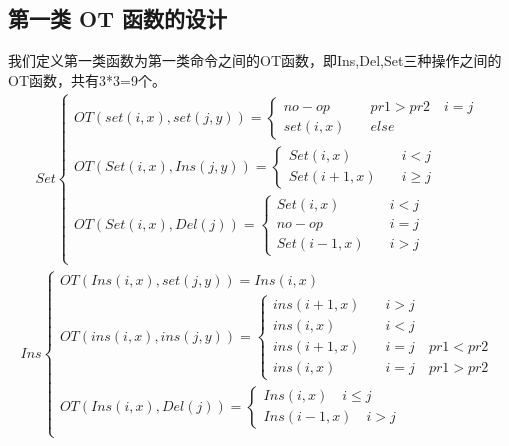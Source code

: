 \subsection{第一类 OT 函数的设计}
我们定义第一类函数为第一类命令之间的OT函数，即Ins,Del,Set三种操作之间的OT函数，共有3*3=9个。
\begin{equation}
\begin{aligned}
Set \begin{cases}
OT(set (i,x), set (j,y)) =\begin{cases}
    no-op \quad &pr1 > pr2 \quad i=j\\
	{set (i,x)} \quad &else \end{cases} \\ 
OT(Set(i,x),Ins(j,y))=\begin{cases}
{Set(i,x)}  \quad &i<j\\
{Set(i+1,x)} \quad  &i\ge j \end{cases} \\
OT(Set(i,x),Del(j))=\begin{cases}
{Set(i,x)} \quad &i<j\\
{no-op} \quad & i=j\\
{Set(i-1,x)} \quad &i>j \end{cases} \\
\end{cases}
\end{aligned}
\end{equation}
\begin{equation}
\begin{aligned}
Ins \begin{cases}
OT(Ins(i,x), set (j,y)) =
{Ins(i,x)}\\
OT(ins (i,x), ins (j,y)) =\begin{cases}
	{ins(i+1, x)}   \quad & i > j\\
	{ins(i, x)}    \quad & i < j\\
	{ins(i+1, x)}   \quad  & i = j \quad pr1 < pr2\\
	{ins(i, x)}   \quad  & i = j \quad pr1 > pr2 \end{cases} \\
OT(Ins(i,x),Del(j))=\begin{cases}
{Ins(i,x)}  \quad i \le j\\
{Ins(i-1,x)} \quad i>j \end{cases}\\
\end{cases}
\end{aligned}
\end{equation}


